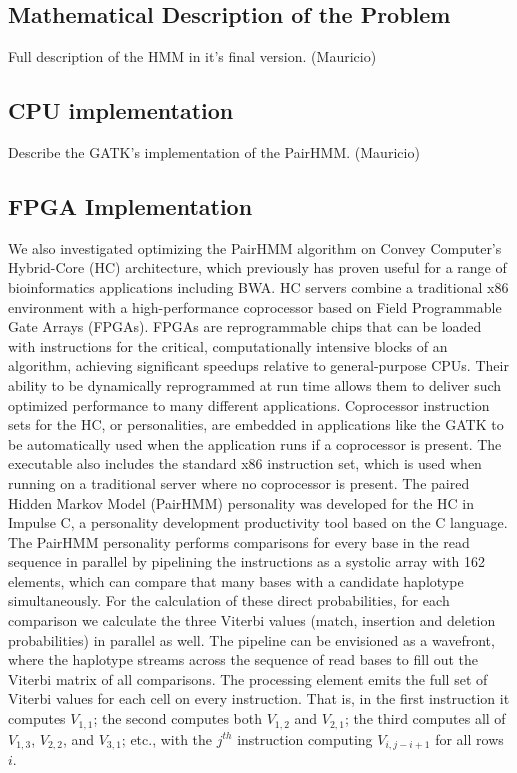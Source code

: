 \documentclass[11pt, oneside]{article}
\begin{document}
	\subsection{Mathematical Description of the Problem} 
	
	Full description of the HMM in it's final version.  (Mauricio) 
	
	\subsection{CPU implementation} 
	
	Describe the GATK's implementation of the PairHMM. (Mauricio) 
	
	\subsection{FPGA Implementation} 
	
	We also investigated optimizing the PairHMM algorithm on Convey Computer’s
	Hybrid-Core (HC) architecture, which previously has proven useful for a
	range of bioinformatics applications including BWA. HC servers combine a
	traditional x86 environment with a high-performance coprocessor based on
	Field Programmable Gate Arrays (FPGAs).  FPGAs are reprogrammable chips that
	can be loaded with instructions for the critical, computationally intensive
	blocks of an algorithm, achieving significant speedups relative to
	general-purpose CPUs. Their ability to be dynamically reprogrammed at run
	time allows them to deliver such optimized performance to many different
	applications.   Coprocessor instruction sets for the HC, or personalities,
	are embedded in applications like the GATK to be automatically used when the
	application runs if a coprocessor is present.  The executable also includes
	the standard x86 instruction set, which is used when running on a
	traditional server where no coprocessor is present.  The paired Hidden
	Markov Model (PairHMM) personality was developed for the HC in Impulse C,
	a personality development productivity tool based on the C language.  The
	PairHMM personality performs comparisons for every base in the read sequence
	in parallel by pipelining the instructions as a systolic array with 162
	elements, which can compare that many bases with a candidate haplotype
	simultaneously.  For the calculation of these direct probabilities, for each
	comparison we calculate the three Viterbi values
	(match, insertion and deletion probabilities) in parallel as well.  The pipeline can be
	envisioned as a wavefront, where the haplotype streams across the sequence
	of read bases to fill out the Viterbi matrix of all comparisons.  The
	processing element emits the full set of Viterbi values for each cell on
	every instruction.  That is, in the first instruction it computes $V_{1,1}$; the
	second computes both $V_{1,2}$ and $V_{2,1}$; the third computes all of $V_{1,3}$, $V_{2,2}$,
	and $V_{3,1}$; etc., with the $j^{th}$ instruction computing $V_{i,j−i+1}$
	for all rows $i$.
	
\end{document}
